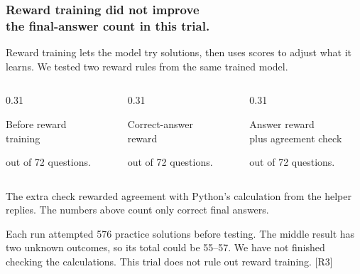 \documentclass[aspectratio=169,11pt]{beamer}
\newcommand{\smallnote}[1]{\vfill{\scriptsize\color{Muted}#1\par}}
\begin{document}
\begin{frame}[t]
\frametitle{Reward training did not improve\\the final-answer count in this trial.}
Reward training lets the model try solutions, then uses scores to adjust what it learns. We tested two reward rules from the same trained model.\par
\vspace{1mm}
\begin{columns}[T,onlytextwidth]
\begin{column}{0.31\textwidth}
\begin{block}{Before reward\\training}
\centering\vspace{2mm}{\Huge 57}\par\vspace{2mm}
out of 72 questions.
\end{block}
\end{column}
\begin{column}{0.31\textwidth}
\begin{block}{Correct-answer\\reward}
\centering\vspace{2mm}{\Huge 55}\par\vspace{2mm}
out of 72 questions.
\end{block}
\end{column}
\begin{column}{0.31\textwidth}
\begin{block}{Answer reward\\plus agreement check}
\centering\vspace{2mm}{\Huge 54}\par\vspace{2mm}
out of 72 questions.
\end{block}
\end{column}
\end{columns}
\vspace{2mm}
The extra check rewarded agreement with Python's calculation from the helper replies. The numbers above count only correct final answers.
\smallnote{Each run attempted 576 practice solutions before testing. The middle result has two unknown outcomes, so its total could be 55--57. We have not finished checking the calculations. This trial does not rule out reward training. [R3]}
\end{frame}
\end{document}
